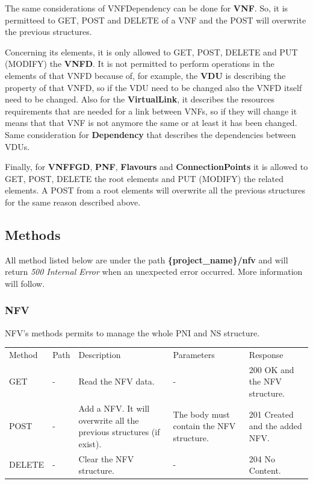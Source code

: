 \documentclass[11pt, english]{article}
\begin{document}
The same considerations of VNFDependency can be done for \textbf{VNF}. So, it is permitteed to GET, POST and DELETE of a VNF and the POST will overwrite the previous structures.

Concerning its elements, it is only allowed to GET, POST, DELETE and PUT (MODIFY) the \textbf{VNFD}. It is not permitted to perform operations in the elements of that VNFD because of, for example, the \textbf{VDU} is describing the property of that VNFD, so if the VDU need to be changed also the VNFD itself need to be changed. Also for the \textbf{VirtualLink}, it describes the resources requirements that are needed for a link between VNFs, so if they will change it means that that VNF is not anymore the same or at least it has been changed. Same consideration for \textbf{Dependency} that describes the dependencies between VDUs.

Finally, for \textbf{VNFFGD}, \textbf{PNF}, \textbf{Flavours} and \textbf{ConnectionPoints} it is allowed to GET, POST, DELETE the root elements and PUT (MODIFY) the related elements. A POST from a root elements will overwrite all the previous structures for the same reason described above.

\subsection{Methods}
All method listed below are under the path \textbf{\{project\_name\}/nfv} and will return \textit{500 Internal Error} when an unexpected error occurred. More information will follow.

\subsubsection{NFV}
NFV's methods permits to manage the whole PNI and NS structure. \\

\begin{tabular}{ |p{2cm}|m{3cm}|p{3cm}|p{3cm}|p{4cm}| }
    \hline
    \rowcolor{black} \multicolumn{5}{|c|}{\textcolor{white}{NFV}} \\
    \hline
    \rowcolor{Gray}
    Method & Path & Description & Parameters & Response \\
    \hline
    GET   & - & Read the NFV data. & - & 200 OK and the NFV structure. \\
    \hline
    POST & - & Add a NFV. It will overwrite all the previous structures (if exist). & The body must contain the NFV structure. & 201 Created and the added NFV. \\
    \hline
    DELETE & - & Clear the NFV structure.  & - & 204 No Content. \\
    \hline
\end{tabular}
\end{document}
